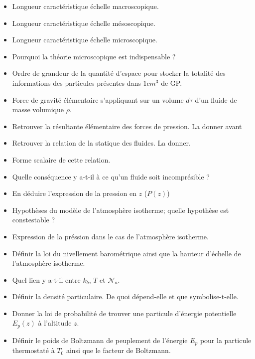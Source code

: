 \documentclass[a4paper, 11pt, hidelinks]{article}
\begin{document}
\begin{itemize}
    \item Longueur caractéristique échelle macroscopique. \cite{Chapitre24}
    \item Longueur caractéristique échelle mésoscopique. \cite{Chapitre24}
    \item Longueur caractéristique échelle microscopique. \cite{Chapitre24}
    \item Pourquoi la théorie microscopique est indispensable ? \cite{Chapitre24}
    \item Ordre de grandeur de la quantité d'espace pour stocker la totalité des informations des particules présentes dans $1 cm^3$ de GP. \cite{Chapitre24}
    \item Force de gravité élémentaire s'appliquant sur un volume $d\tau $ d'un fluide de masse volumique $\rho$. \cite{Chapitre24}
    \item Retrouver la résultante élémentaire des forces de pression. La donner avant \cite{Chapitre24}
    \item Retrouver la relation de la statique des fluides. La donner. \cite{Chapitre24}
    \item Forme scalaire de cette relation. \cite{Chapitre24}
    \item Quelle conséquence y a-t-il à ce qu'un fluide soit incomprésible ? \cite{Chapitre24}
    \item En déduire l'expression de la pression en $z$ ($P(z)$) \cite{Chapitre24}
    \item Hypothèses du modèle de l'atmosphère  isotherme; quelle hypothèse est constestable ? \cite{Chapitre24}
    \item Expression de la préssion dans le cas de l'atmosphère isotherme. \cite{Chapitre24}
    \item Définir la loi du nivellement barométrique ainsi que la hauteur d'échelle de l'atmosphère isotherme. \cite{Chapitre24}
    \item Quel lien y a-t-il entre $k_b$, $T$ et $\mathscr{N}_a$. \cite{Chapitre24}
    \item Définir la densité particulaire. De quoi dépend-elle et que symbolise-t-elle. \cite{Chapitre24}
    \item Donner la loi de probabilité de trouver une particule d'énergie potentielle $E_p(z)$ à l'altitude $z$. \cite{Chapitre24}
    \item Définir le poids de Boltzmann de peuplement de l'énergie $E_p$ pour la particule thermostaté à $T_0$ ainsi que le facteur de Boltzmann. \cite{Chapitre24}

\end{itemize}
\end{document}
